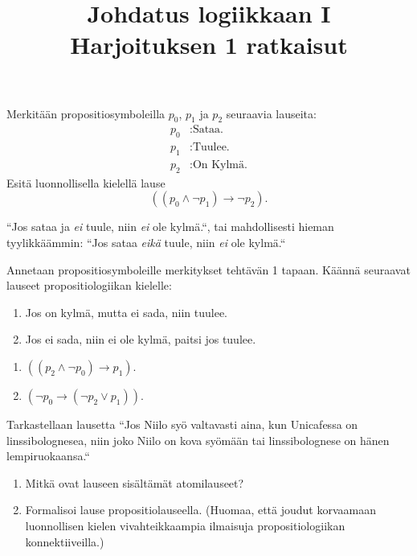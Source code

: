 \documentclass[11pt,a4paper]{amsart}
\title{Johdatus logiikkaan I\\Harjoituksen 1 ratkaisut}
\author{}
\date{}
\begin{document}

\begin{exercise}
  Merkitään propositiosymboleilla \(p_0\), \(p_1\) ja \(p_2\) seuraavia
  lauseita:
  \begin{align*}
    p_0&: \text{Sataa.} \\
    p_1&: \text{Tuulee.} \\
    p_2&: \text{On Kylmä.}
  \end{align*}
  Esitä luonnollisella kielellä lause
  \[\left((p_0 \land \neg p_1) \rightarrow \neg p_2\right).\]
\end{exercise}

\begin{solution}
  ``Jos sataa ja \emph{ei} tuule, niin \emph{ei} ole kylmä.``, tai mahdollisesti
  hieman tyylikkäämmin: ``Jos sataa \emph{eikä} tuule, niin \emph{ei}
  ole kylmä.``
\end{solution}

\begin{exercise}
  Annetaan propositiosymboleille merkitykset tehtävän 1 tapaan. Käännä
  seuraavat lauseet propositiologiikan kielelle:
\begin{enumerate}[label=\alph*), nosep]
  \item Jos on kylmä, mutta ei sada, niin tuulee.
  \item Jos ei sada, niin ei ole kylmä, paitsi jos tuulee.
\end{enumerate}
\end{exercise}

\begin{solution}
\leavevmode\par
\begin{enumerate}[label=\alph*), nosep]
\item \(((p_2 \land \neg p_0) \rightarrow p_1).\)
\item \((\neg p_0 \rightarrow (\neg p_2 \lor p_1)).\)
\end{enumerate}
\end{solution}

\begin{exercise}
Tarkastellaan lausetta ``Jos Niilo syö valtavasti aina, kun Unicafessa
on linssibolognesea, niin joko Niilo on kova syömään tai linssibolognese on
hänen lempiruokaansa.``
\begin{enumerate}[label=\alph*), nosep]
\item Mitkä ovat lauseen sisältämät atomilauseet?
\item Formalisoi lause propositiolauseella. (Huomaa, että joudut korvaamaan
  luonnollisen kielen vivahteikkaampia ilmaisuja propositiologiikan
konnektiiveilla.)
\end{enumerate}
\end{exercise}
\end{document}

